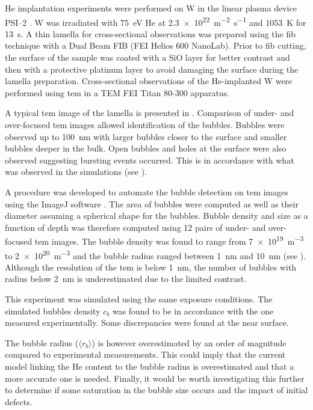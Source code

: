 
He implantation experiments were performed on W in the linear plasma device PSI--2 .
W was irradiated with \SI{75}{eV} He at \SI{2.3e22}{m^{-2}.s^{-1}} and \SI{1053}{K} for \SI{13}{s}.
A thin lamella for cross-sectional observations was prepared using the \gls{fib} technique with a Dual Beam FIB (FEI Helios 600 NanoLab).
Prior to \gls{fib} cutting, the surface of the sample was coated with a SiO layer for better contrast and then with a protective platinum layer to avoid damaging the surface during the lamella preparation.
Cross-sectional observations of the He-implanted W were performed using \gls{tem} in a TEM FEI Titan 80-300 apparatus.

A typical \gls{tem} image of the lamella is presented in .
Comparison of under- and over-focused \gls{tem} images allowed identification of the bubbles.
Bubbles were observed up to \SI{100}{nm} with larger bubbles closer to the surface and smaller bubbles deeper in the bulk.
Open bubbles and holes at the surface were also observed suggesting bursting events occurred.
This is in accordance with what was observed in the simulations (see ).

A procedure was developed to automate the bubble detection on \gls{tem} images using the ImageJ software .
The area of bubbles were computed as well as their diameter assuming a spherical shape for the bubbles.
Bubble density and size as a function of depth was therefore computed using 12 pairs of under- and over-focused \gls{tem} images.
The bubble density was found to range from \SI{7e19}{m^{-3}} to \SI{2e20}{m^{-3}} and the bubble radius ranged between \SI{1}{nm} and \SI{10}{nm} (see ).
Although the resolution of the \gls{tem} is below \SI{1}{nm}, the number of bubbles with radius below \SI{2}{nm} is underestimated due to the limited contrast.

This experiment was simulated using the same exposure conditions.
The simulated bubbles density $c_b$ was found to be in accordance with the one measured experimentally.
Some discrepancies were found at the near surface.

The bubble radius ($\langle r_b \rangle$) is however overestimated by an order of magnitude compared to experimental measurements.
This could imply that the current model linking the He content to the bubble radius is overestimated and that a more accurate one is needed.
Finally, it would be worth investigating this further to determine if some saturation in the bubble size occurs and the impact of initial defects.
